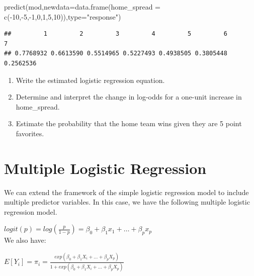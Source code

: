 \documentclass[
  11pt,
]{book}
\newenvironment{Shaded}{\begin{snugshade}}{\end{snugshade}}
\newcommand{\AttributeTok}[1]{\textcolor[rgb]{0.77,0.63,0.00}{#1}}
\newcommand{\DecValTok}[1]{\textcolor[rgb]{0.00,0.00,0.81}{#1}}
\newcommand{\FunctionTok}[1]{\textcolor[rgb]{0.00,0.00,0.00}{#1}}
\newcommand{\NormalTok}[1]{#1}
\newcommand{\SpecialCharTok}[1]{\textcolor[rgb]{0.00,0.00,0.00}{#1}}
\newcommand{\StringTok}[1]{\textcolor[rgb]{0.31,0.60,0.02}{#1}}
\theoremstyle{definition}
\theoremstyle{definition}
\theoremstyle{definition}
\theoremstyle{definition}
\theoremstyle{remark}
\begin{document}
\begin{Shaded}
\begin{Highlighting}[]
\FunctionTok{predict}\NormalTok{(mod,}\AttributeTok{newdata=}\FunctionTok{data.frame}\NormalTok{(}\AttributeTok{home\_spread =} \FunctionTok{c}\NormalTok{(}\SpecialCharTok{{-}}\DecValTok{10}\NormalTok{,}\SpecialCharTok{{-}}\DecValTok{5}\NormalTok{,}\SpecialCharTok{{-}}\DecValTok{1}\NormalTok{,}\DecValTok{0}\NormalTok{,}\DecValTok{1}\NormalTok{,}\DecValTok{5}\NormalTok{,}\DecValTok{10}\NormalTok{)),}\AttributeTok{type=}\StringTok{"response"}\NormalTok{)}
\end{Highlighting}
\end{Shaded}

\begin{verbatim}
##         1         2         3         4         5         6         7 
## 0.7768932 0.6613590 0.5514965 0.5227493 0.4938505 0.3805448 0.2562536
\end{verbatim}

\begin{enumerate}
\def\labelenumi{(\alph{enumi})}
\item
  Write the estimated logistic regression equation.~\vfill
\item
  Determine and interpret the change in log-odds for a one-unit increase in home\_spread.~\vfill
\item
  Estimate the probability that the home team wins given they are 5 point favorites. ~\vfill
\end{enumerate}

\newpage

\hypertarget{multiple-logistic-regression}{%
\section{Multiple Logistic Regression}\label{multiple-logistic-regression}}

We can extend the framework of the simple logistic regression model to include multiple predictor variables. In this case, we have the following multiple logistic regression model.

\(logit(p) = log\left(\frac{p}{1-p}\right) = \beta_0 + \beta_1 x_1 + \ldots + \beta_p x_p\)\\

We also have:

\(E[Y_i] = \pi_i = \frac{exp(\beta_0+\beta_1X_i+\ldots + \beta_pX_p)}{1+exp(\beta_0+\beta_1X_i+\ldots + \beta_pX_p)}\)\\
\end{document}
